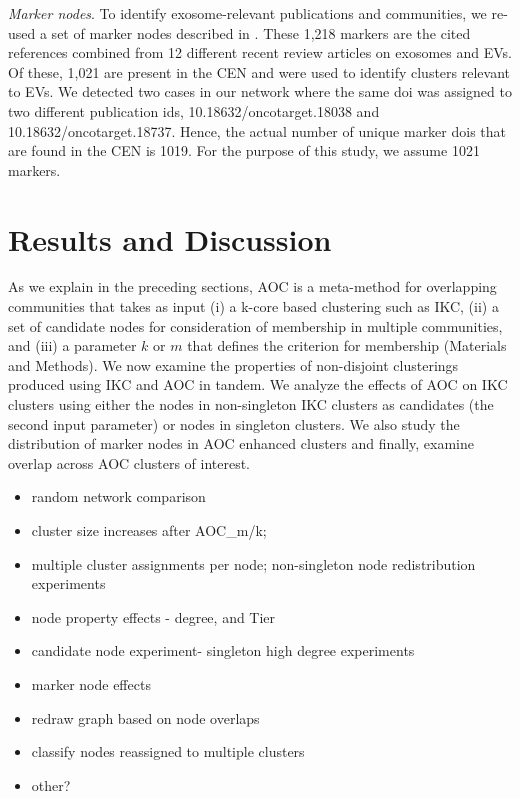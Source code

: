 \documentclass[12pt, oneside]{article}   	%
\begin{document}
\emph{Marker nodes}. To identify exosome-relevant publications and communities, we re-used a set of marker nodes described in  \citep{Wedell2022}. These 1,218 markers are the cited references combined from 12 different recent review articles on exosomes and EVs. Of these, 1,021 are present in the CEN and  were used to identify clusters relevant to EVs. We detected two cases in our network where the same doi was assigned to two different publication ids, 10.18632/oncotarget.18038 and 10.18632/oncotarget.18737. Hence, the actual number of unique marker dois that are found in the CEN is 1019. For the purpose of this study, we assume 1021 markers.

\section{Results and Discussion}

As we explain in the preceding sections, AOC is a meta-method for overlapping communities that takes as input (i) a k-core based clustering such as IKC, (ii) a set of candidate nodes for consideration of membership in multiple communities, and (iii) a parameter $k$ or $m$ that defines the criterion for membership (Materials and Methods). We now examine the properties of non-disjoint clusterings produced using IKC and AOC in tandem. We analyze the effects of AOC on IKC clusters using either the nodes in non-singleton IKC clusters as candidates (the second input parameter) or nodes in singleton clusters. We also study the distribution of marker nodes in AOC enhanced clusters and finally, examine overlap across AOC clusters of interest. 

\begin{itemize}
\item random network comparison
\item cluster size increases after AOC\_m/k; 
\item multiple cluster assignments per node; non-singleton node redistribution experiments
\item node property effects - degree, and Tier
\item candidate node experiment- singleton high degree experiments
\item marker node effects
\item redraw graph based on node overlaps
\item classify nodes reassigned to multiple clusters
\item other?
\end{itemize}
\end{document}
